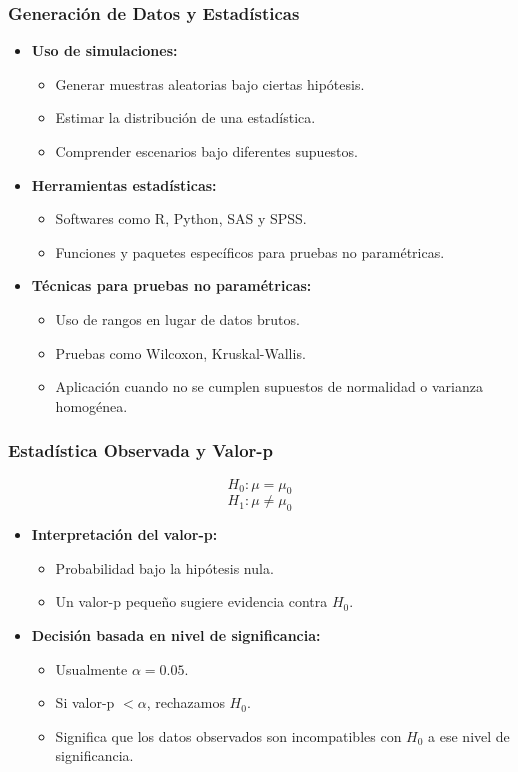 \documentclass[aspectratio=169]{beamer}
\begin{document}
\begin{frame}
\frametitle{Generación de Datos y Estadísticas}
\begin{itemize}
    \item \textbf{Uso de simulaciones:}
    \begin{itemize}
        \item Generar muestras aleatorias bajo ciertas hipótesis.
        \item Estimar la distribución de una estadística.
        \item Comprender escenarios bajo diferentes supuestos.
    \end{itemize}
    
    \item \textbf{Herramientas estadísticas:}
    \begin{itemize}
        \item Softwares como R, Python, SAS y SPSS.
        \item Funciones y paquetes específicos para pruebas no paramétricas.
    \end{itemize}
    
    \item \textbf{Técnicas para pruebas no paramétricas:}
    \begin{itemize}
        \item Uso de rangos en lugar de datos brutos.
        \item Pruebas como Wilcoxon, Kruskal-Wallis.
        \item Aplicación cuando no se cumplen supuestos de normalidad o varianza homogénea.
    \end{itemize}
\end{itemize}
\end{frame}

\begin{frame}
\frametitle{Estadística Observada y Valor-p}
\[ H_0: \mu = \mu_0 \]
\[ H_1: \mu \neq \mu_0 \]
\begin{itemize}
    \item \textbf{Interpretación del valor-p:}
    \begin{itemize}
        \item Probabilidad bajo la hipótesis nula.
        \item Un valor-p pequeño sugiere evidencia contra \(H_0\).
    \end{itemize}
    
    \item \textbf{Decisión basada en nivel de significancia:}
    \begin{itemize}
        \item Usualmente \( \alpha = 0.05 \).
        \item Si valor-p \(< \alpha\), rechazamos \(H_0\).
        \item Significa que los datos observados son incompatibles con \(H_0\) a ese nivel de significancia.
    \end{itemize}
\end{itemize}
\end{frame}
\end{document}
